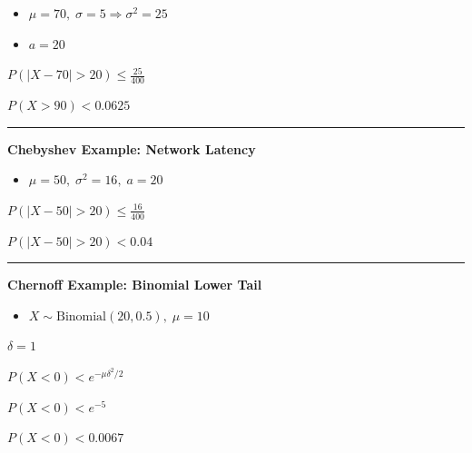 \documentclass[12pt]{article}
\begin{document}
\begin{itemize}
    \item $\mu = 70, \; \sigma = 5 \Rightarrow \sigma^2 = 25$
    \item $a = 20$
\end{itemize}

\begin{center}
    $P(|X - 70| > 20) \leq \frac{25}{400}$
\end{center}

\begin{center}
    $P(X > 90) < 0.0625$
\end{center}

\vspace{1em}
\hrule
\vspace{1em}

\textbf{Chebyshev Example: Network Latency}

\begin{itemize}
    \item $\mu = 50, \; \sigma^2 = 16, \; a = 20$
\end{itemize}

\begin{center}
    $P(|X - 50| > 20) \leq \frac{16}{400}$
\end{center}

\begin{center}
    $P(|X - 50| > 20) < 0.04$
\end{center}

\vspace{1em}
\hrule
\vspace{1em}

\textbf{Chernoff Example: Binomial Lower Tail}

\begin{itemize}
    \item $X \sim \text{Binomial}(20, 0.5), \; \mu = 10$
\end{itemize}

\begin{center}
    $\delta = 1$
\end{center}

\begin{center}
    $P(X < 0) < e^{-\mu \delta^2 / 2}$
\end{center}

\begin{center}
    $P(X < 0) < e^{-5}$
\end{center}

\begin{center}
    $P(X < 0) < 0.0067$
\end{center}
\end{document}

